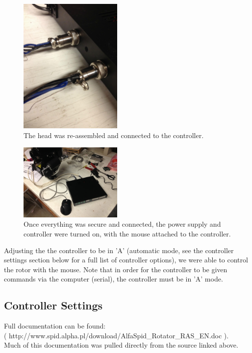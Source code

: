 \documentclass[11pt]{article} %
\begin{document}
\begin{figure}
  \centering
  \caption{The head was re-assembled and connected to the controller.}
  \includegraphics[width=0.45\textwidth]{wiring/09.jpeg}
\end{figure}


\begin{figure}
  \centering
  \caption{Once everything was secure and connected, the power supply and controller were turned on, with the mouse attached to the controller. }
  \includegraphics[width=0.45\textwidth]{wiring/10.jpeg}
\end{figure}

\vspace{3.5cm}
Adjusting the the controller to be in 'A' (automatic mode, see the controller settings section below for a full list of controller options), we were able to control the rotor with the mouse. Note that in order for the controller to be given commands via the computer (serial), the controller must be in 'A' mode.



\subsection{Controller Settings}

Full documentation can be found: \\ ( http://www.spid.alpha.pl/download/AlfaSpid\_Rotator\_RAS\_EN.doc ).\\ Much of this documentation was pulled directly from the source linked above.
\end{document}
